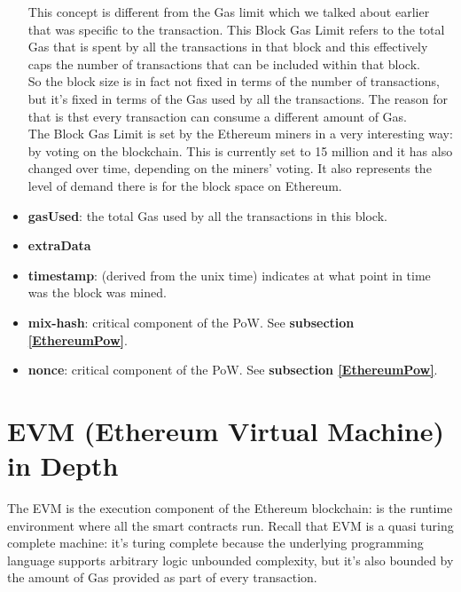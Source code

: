 \begin{itemize}
    This concept is different from the Gas limit which we talked about earlier that was specific to the transaction.
    This Block Gas Limit refers to the total Gas that is spent by all the transactions in that block and this effectively caps the number of transactions that can be included within that block.\\

    So the block size is in fact not fixed in terms of the number of transactions, but it's fixed in terms of the Gas used by all the transactions.
    The reason for that is thst every transaction can consume a different amount of Gas.\\

    The Block Gas Limit is set by the Ethereum miners in a very interesting way: by voting on the blockchain.
    This is currently set to 15 million and it has also changed over time, depending on the miners' voting.
    It also represents the level of demand there is for the block space on Ethereum.

    \item\textbf{gasUsed}: the total Gas used by all the transactions in this block.

    \item\textbf{extraData} %

    \item\textbf{timestamp}: (derived from the unix time) indicates at what point in time was the block was mined.

    \item\textbf{mix-hash}: critical component of the PoW.
    See \textbf{subsection \ref{EthereumPow}}.

    \item\textbf{nonce}: critical component of the PoW.
    See \textbf{subsection \ref{EthereumPow}}.
\end{itemize}

\section{EVM (Ethereum Virtual Machine) in Depth}

The EVM is the execution component of the Ethereum blockchain: is the runtime environment where all the smart contracts run.
Recall that EVM is a quasi turing complete machine: it's turing complete because the underlying programming language supports arbitrary logic unbounded complexity, but it's also bounded by the amount of Gas provided as part of every transaction.\\

